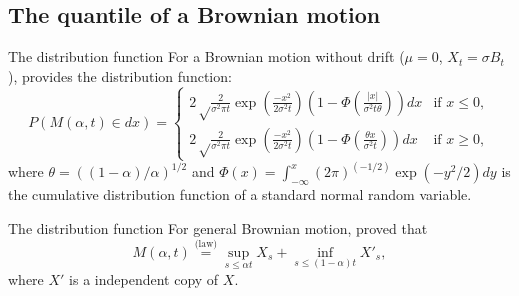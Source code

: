 \documentclass[cjk,10pt]{beamer}
\def\eqlaw{{\stackrel{\text{(law)}}{=}}}
\begin{document}
\subsection{The quantile of a Brownian motion}
\begin{frame}{The distribution function}
For a Brownian motion without drift ($\mu=0$, $X_t=\sigma B_t$), \cite{Yor1995} provides the distribution function:
\vspace{1em}
{\small
\begin{equation}
P(M(\alpha,t)\in dx)= \begin{cases}
\displaystyle 2\sqrt\frac{2}{\sigma^2\pi t}\exp\left(\frac{-x^2} {2\sigma^2 t}\right)\left(1-\Phi\left(\frac{|x|} {\sigma^2 t\theta}\right)\right)dx  &  \text{if } x \leq 0 ,\\
\displaystyle 2\sqrt\frac{2}{\sigma^2\pi t}\exp\left(\frac{-x^2} {2\sigma^2 t}\right)\left(1-\Phi\left(\frac{\theta x}{\sigma^2 t}\right)\right)dx  & \text{if } x \geq 0,
\end{cases}
\end{equation}
}
where $\theta = ((1 - \alpha)/\alpha)^{1/2}$ and $\Phi(x)=\int^{x}_{-\infty}(2\pi)^{(-1/2)}\exp(-y^2 /2)dy$ is the cumulative distribution function of a standard normal random variable.
\end{frame}

\begin{frame}{The distribution function}
For general Brownian motion, \cite{Dassios1995} proved that
\begin{equation}\label{eq:Dassios}
M(\alpha, t) \eqlaw \sup_{s \leq \alpha t} X_s + \inf_{s\leq (1-\alpha)t} X'_s ,
\end{equation}
where $X'$ is a independent copy of $X$.
\end{frame}
\end{document}
